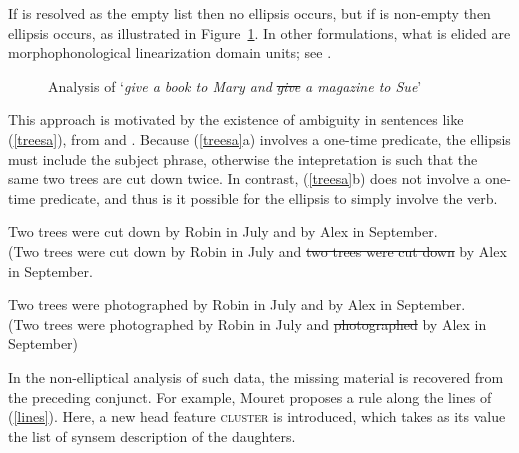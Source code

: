 \documentclass[output=paper
                ,modfonts
                ,nonflat
	        ,collection
	        ,collectionchapter
	        ,collectiontoclongg
 	        ,biblatex
                ,babelshorthands
                ,newtxmath
                ,draftmode
                ,colorlinks, citecolor=brown
]{./langsci/langscibook}
\begin{document}
\noindent
If  is resolved as the empty list then no ellipsis occurs, but if  is non-empty then ellipsis occurs, as illustrated in Figure~\ref{lpe}. In other formulations, what is elided are morphophonological
linearization domain units; see \citet{chaveslp}.

\begin{figure}[ht]
    \centering
    

    \caption{Analysis of `\emph{give a book to Mary and} \sout{\emph{give}} \emph{a magazine to Sue}'}\label{lpe}
\end{figure}

\noindent
This approach is motivated by the existence of ambiguity in 
sentences like (\ref{treesa}), from \citet{Beavers} and \citet{chaves06}. Because (\ref{treesa}a) involves a one-time predicate, the ellipsis must include the subject phrase, otherwise
the intepretation is such that the same two trees are cut down twice. In contrast,  (\ref{treesa}b) does not involve a one-time
predicate, and thus is it possible for the ellipsis to simply
involve the verb.


\begin{exe}
\ex 
\begin{xlista}
\ex Two trees were cut down by Robin in July and by Alex in September.\\
(Two trees were cut down by Robin in July and \sout{two trees were cut down} by Alex in September.

\ex Two trees were photographed by Robin in July and by Alex in September.\\
(Two trees were photographed by Robin in July and \sout{photographed} by Alex in September)
\end{xlista}\label{treesa}
\end{exe}



In the non-elliptical analysis of such data, the missing material is recovered from the preceding conjunct. For example, Mouret proposes a rule along the lines of (\ref{lines}).  Here, a new head feature \textsc{cluster} is introduced, which  takes as its value the list of synsem 
description of the  daughters.
\end{document}
